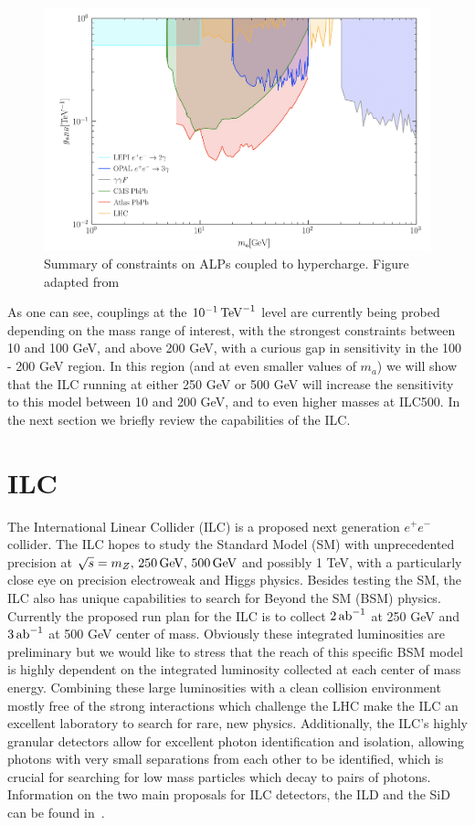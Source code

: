 \documentclass[aps,onecolumn,twoside,secnumarabic,12pt,balancelastpage,amsmath,amssymb,nofootinbib,hyperref=pdftex]{revtex4}
\begin{document}
\begin{figure}[t]
\begin{center}
\includegraphics[width=14cm]{old_bounds.png}
\caption{Summary of constraints on ALPs coupled to hypercharge. Figure adapted from\cite{Jaeckel:2015jla}}
\label{fig:former_constraints}
\end{center}
\end{figure}
As one can see, couplings at the $10^{-1}\,\rm{TeV}^{-1}$ level are currently being probed depending on the mass range of interest, with the strongest constraints between 10 and 100 GeV, and above 200 GeV, with a curious gap in sensitivity in the 100 - 200 GeV region. In this region (and at even smaller values of $m_{a}$) we will show that the ILC running at either 250 GeV or 500 GeV will increase the sensitivity to this model between 10 and 200 GeV, and to even higher masses at ILC500. In the next section we briefly review the capabilities of the ILC.
\section{ILC}
The International Linear Collider (ILC) is a proposed next generation $e^{+}e^{-}$ collider\cite{Bambade:2019fyw}. The ILC hopes to study the Standard Model (SM) with unprecedented precision at $\sqrt{s} = m_{Z},\,250\,\rm{GeV},\,500\,\rm{GeV}$ and possibly 1 TeV, with a particularly close eye on precision electroweak and Higgs physics. Besides testing the SM, the ILC also has unique capabilities to search for Beyond the SM (BSM) physics. Currently the proposed run plan for the ILC is to collect $2\,\rm{ab}^{-1}$ at 250 GeV and $3\,\rm{ab}^{-1}$ at 500 GeV center of mass. Obviously these integrated luminosities are preliminary but we would like to stress that the reach of this specific BSM model is highly dependent on the integrated luminosity collected at each center of mass energy. Combining these large luminosities with a clean collision environment mostly free of the strong interactions which challenge the LHC make the ILC an excellent laboratory to search for rare, new physics. Additionally, the ILC's highly granular detectors allow for excellent photon identification and isolation, allowing photons with very small separations from each other to be identified, which is crucial for searching for low mass particles which decay to pairs of photons. Information on the two main proposals for ILC detectors, the ILD and the SiD can be found in~\cite{ILD,SiD}.
\end{document}
